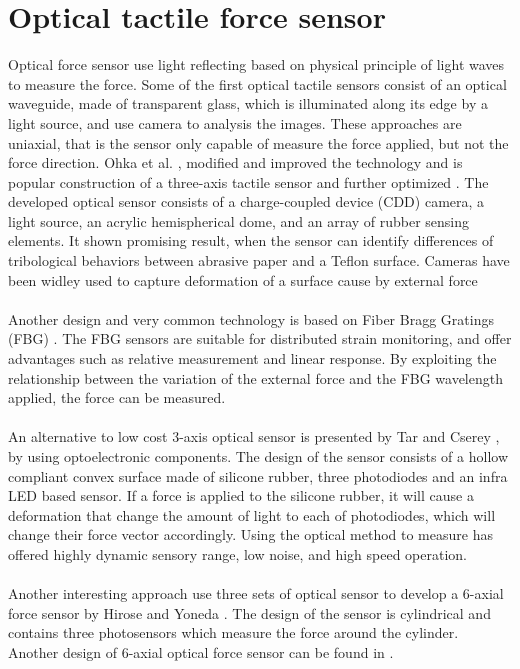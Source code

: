 \documentclass[USenglish]{ifimaster}  %
\begin{document}
\section{Optical tactile force sensor}
Optical force sensor use light reflecting based on physical principle of light waves to measure the force. Some of the first optical tactile sensors \cite{220165,Nicholls1990} consist of an optical waveguide, made of transparent glass, which is illuminated along its edge by a light source, and use camera to analysis the images. These approaches are uniaxial, that is the sensor only capable of measure the force applied, but not the force direction. Ohka et al. \cite{525384}, modified and improved the technology and is popular construction of a three-axis tactile sensor and further optimized \cite{572232,ohka_mitsuya_matsunaga_takeuchi_2004,1545264}. The developed optical sensor consists of a charge-coupled device (CDD) camera, a light source, an acrylic hemispherical dome, and an array of rubber sensing elements. It shown promising result, when the sensor can identify differences of tribological behaviors between abrasive paper and a Teflon surface. Cameras have been widley used to capture deformation of a surface cause by external force \cite{1381228,7559098}
\\
\\
Another design and very common technology is based on Fiber Bragg Gratings (FBG) \cite{Heo2006312}. The FBG sensors are suitable for distributed strain monitoring, and offer advantages such as relative measurement and linear response. By exploiting the relationship between the variation of the external force and the FBG wavelength applied, the force can be measured.
\\
\\ 
An alternative to low cost 3-axis optical sensor is presented by Tar and Cserey \cite{6027100}, by using optoelectronic components. The design of the sensor consists of a hollow compliant convex surface made of silicone rubber, three photodiodes and an infra LED based sensor.  If a force is applied to the silicone rubber, it will cause a deformation that change the amount of light to each of photodiodes, which will change their force vector accordingly. Using the optical method to measure has offered highly dynamic sensory range, low noise, and high speed operation.
\\
\\
Another interesting approach use three sets of optical sensor to develop a 6-axial force sensor by Hirose and Yoneda \cite{125944}. The design of the sensor is cylindrical and contains three photosensors which measure the force around the cylinder. Another design of 6-axial optical force sensor can be found in \cite{6907805,6290303}.
\end{document}

